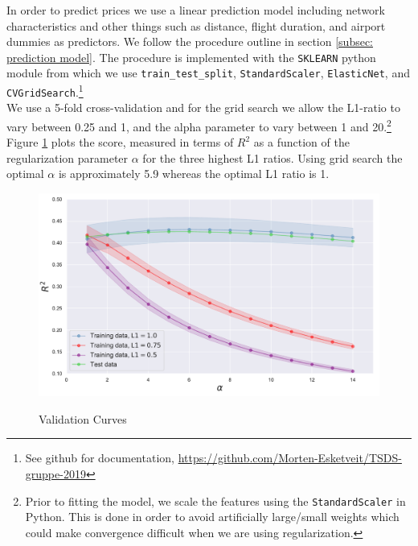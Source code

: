 \noindent
In order to predict prices we use a linear prediction model including network characteristics and other things such as distance, flight duration, and airport dummies as predictors. We follow the procedure outline in section \ref{subsec: prediction model}. The procedure is implemented with the \texttt{SKLEARN} python module from which we use \texttt{train\_test\_split}, \texttt{StandardScaler}, \texttt{ElasticNet}, and  \texttt{CVGridSearch}.\footnote{See github for documentation, \url{https://github.com/Morten-Esketveit/TSDS-gruppe-2019}}
\medskip\\
We use a 5-fold cross-validation and for the grid search we allow the L1-ratio to vary between 0.25 and 1, and the alpha parameter to vary between 1 and 20.\footnote{Prior to fitting the model, we scale the features using the \texttt{StandardScaler} in Python. This is done in order to avoid artificially large/small weights which could make convergence difficult when we are using regularization.} Figure \ref{fig:validation curve} plots the score, measured in terms of $R^2$ as a function of the regularization parameter $\alpha$ for the three highest L1 ratios. Using grid search the optimal $\alpha$ is approximately 5.9 %
whereas the optimal L1 ratio is 1.
\begin{figure}[H]
  \centering
  \caption{Validation Curves}
    \includegraphics[width=1. \textwidth]{Exam/Figures/validation_curve.pdf}
  \label{fig:validation curve}
\end{figure}
\noindent

